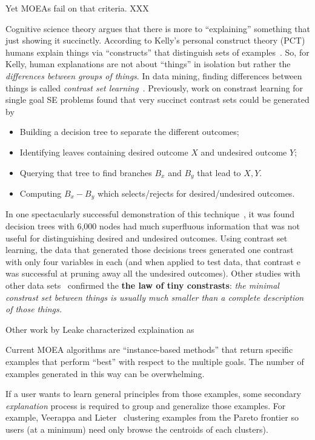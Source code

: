 \documentclass[runningheads]{llncs}
\newcommand{\bi}{\begin{itemize}}
\newcommand{\ei}{\end{itemize}}
\begin{document}
Yet MOEAs fail on that
criteria. XXX

Cognitive science theory argues that
there is more to ``explaining'' something that just
showing it succinctly. According to Kelly's personal
construct theory (PCT) humans explain things via
``constructs'' that distinguish sets of examples~\cite{kelly55}.
So, for Kelly, human explanations are not about
``things'' in isolation but rather the {\em
differences between groups of things}. In data mining, finding
differences between things is called {\em contrast set learning}~\cite{webb09}.
Previously, work on
constrast learning for single goal SE problems
 found that very succinct contrast sets could be generated by 
\bi
\item Building a decision tree to separate the different outcomes;
\item Identifying leaves containing desired outcome $X$ and undesired outcome $Y$;
\item Querying that tree to find branches $B_x$ and $B_y$ that lead to
$X,Y$.
\item Computing  $B_x - B_y$ which   selects/rejects for
desired/undesired outcomes.
\ei
In one spectacularly successful demonstration of this technique~\cite{me03c}, it was found decision trees with 6,000 nodes had much
superfluous information that was not useful
for  distinguishing
desired and undesired outcomes.   
Using contrast set learning, the data that generated those
decisions trees generated
one
contrast   with only four variables in each (and when
applied to test data, that contrast
e was successful
at pruning away all the undesired outcomes). Other studies
with other data sets~\cite{me07} 
confirmed the {\bf
the law of tiny constrasts}:  {\em 
the minimal constrast set between things is usually much smaller
than a complete description of those things.}


Other  work by Leake characterized explaination as

Current MOEA algorithms are ``instance-based methods'' that return
specific examples that perform ``best'' with respect to the multiple goals.
The number of examples generated in this way can be overwhelming.

If a user wants to learn general principles from those examples,
some secondary {\em explanation} process is required to group and generalize those
examples.
For example,  Veerappa and Lieter~\cite{veerappa11} clustering examples from the Pareto
frontier so users (at a minimum) need only browse the centroids of each clusters).
\end{document}
